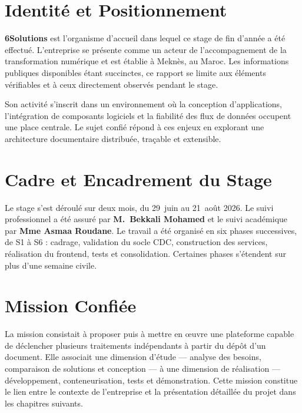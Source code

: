 \documentclass[12pt,a4paper,openany]{report}
\begin{document}
    \section{Identit\'e et Positionnement}

    \textbf{6Solutions} est l'organisme d'accueil dans lequel ce stage de fin d'ann\'ee a \'et\'e effectu\'e. L'entreprise se pr\'esente comme un acteur de l'accompagnement de la transformation num\'erique et est \'etablie \`a Mekn\`es, au Maroc\cite{sixsolutions}. Les informations publiques disponibles \'etant succinctes, ce rapport se limite aux \'el\'ements v\'erifiables et \`a ceux directement observ\'es pendant le stage.

    Son activit\'e s'inscrit dans un environnement o\`u la conception d'applications, l'int\'egration de composants logiciels et la fiabilit\'e des flux de donn\'ees occupent une place centrale. Le sujet confi\'e r\'epond \`a ces enjeux en explorant une architecture documentaire distribu\'ee, tra\c{c}able et extensible.

    \section{Cadre et Encadrement du Stage}

    Le stage s'est d\'eroul\'e sur deux mois, du 29~juin au 21~ao\^ut 2026. Le suivi professionnel a \'et\'e assur\'e par \textbf{M.~Bekkali Mohamed} et le suivi acad\'emique par \textbf{Mme Asmaa Roudane}. Le travail a \'et\'e organis\'e en six phases successives, de S1 \`a S6 : cadrage, validation du socle CDC, construction des services, r\'ealisation du frontend, tests et consolidation. Certaines phases s'\'etendent sur plus d'une semaine civile.

    \section{Mission Confi\'ee}

    La mission consistait \`a proposer puis \`a mettre en œuvre une plateforme capable de d\'eclencher plusieurs traitements ind\'ependants \`a partir du d\'ep\^ot d'un document. Elle associait une dimension d'\'etude --- analyse des besoins, comparaison de solutions et conception --- \`a une dimension de r\'ealisation --- d\'eveloppement, conteneurisation, tests et d\'emonstration. Cette mission constitue le lien entre le contexte de l'entreprise et la pr\'esentation d\'etaill\'ee du projet dans les chapitres suivants.
\end{document}
